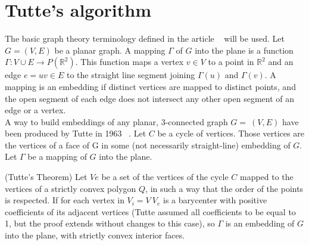 \section{Tutte's algorithm}

The basic graph theory terminology defined in the article ~\cite{pa, pb}
will be used.  Let $G=(V,E)$ be a planar graph. A mapping $\Gamma$ of $G$
into the plane is a function $\Gamma : V \cup E \to P(\mathbb{R}^2)$. This
function maps a vertex $v \in V$ to a point in $\mathbb{R}^2$ and an edge
$e = uv \in E$ to the straight line segment joining $\Gamma(u)$ and
$\Gamma(v)$.  A mapping is an embedding if distinct vertices are mapped to
distinct points, and the open segment of each edge does not intersect any
other open segment of an edge or a vertex.
\\

A way to build embeddings of any planar, 3-connected graph $G=~(V,E)$ have
been produced by Tutte in 1963 ~\cite{pc}. Let $C$ be a cycle of
vertices. Those vertices are the vertices of a face of G in some (not
necessarily straight-line) embedding of $G$. Let $\Gamma$ be a mapping of
$G$ into the plane.






\begin{theo} \label{theo:box} (Tutte’s Theorem) Let $Ve$ be a set of the
  vertices of the cycle $C$ mapped to the vertices of a strictly convex
  polygon $Q$, in such a way that the order of the points is respected.  If
  for each vertex in $V_i = V \ V_e$ is a barycenter with positive
  coefficients of its adjacent vertices (Tutte assumed all coefficients to
  be equal to 1, but the proof extends without changes to this case), so
  $\Gamma$ is an embedding of $G$ into the plane, with strictly convex
  interior faces.
\end{theo}

